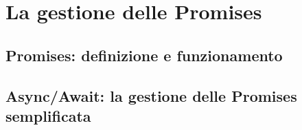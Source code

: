 \section{La gestione delle Promises}

\subsection{Promises: definizione e funzionamento}

\subsection{Async/Await: la gestione delle Promises semplificata}
